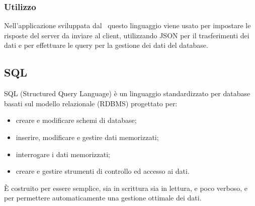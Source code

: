 	\subsubsection{Utilizzo}
	Nell'applicazione sviluppata dal \ questo linguaggio viene usato per impostare le risposte del server da inviare al client, utilizzando JSON per il trasferimenti dei dati e per effettuare le query per la gestione dei dati del database.

\subsection{SQL}
	SQL (Structured Query Language) è un linguaggio standardizzato per database basati sul modello relazionale (RDBMS) progettato per:
	\begin{itemize}
		\item 	creare e modificare schemi di database;
		\item 	inserire, modificare e gestire dati memorizzati;
		\item 	interrogare i dati memorizzati;
		\item 	creare e gestire strumenti di controllo ed accesso ai dati.
	\end{itemize}
	È costruito per essere semplice, sia in scrittura sia in lettura, e poco verboso, e per permettere automaticamente una gestione ottimale dei dati. \\

